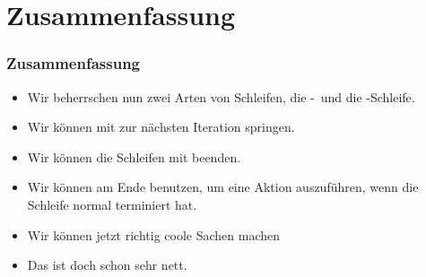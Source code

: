 \documentclass[aspectratio=169,mathserif,notheorems]{beamer}%
\begin{document}
\section{Zusammenfassung}%
%
\begin{frame}%
\frametitle{Zusammenfassung}%
\begin{itemize}%
\item Wir beherrschen nun zwei Arten von Schleifen, die -\ und die -Schleife.%
%
\item<2-> Wir können mit  zur nächsten Iteration springen.%
%
\item<3-> Wir können die Schleifen mit  beenden.%
%
\item<4-> Wir können  am Ende benutzen, um eine Aktion auszuführen, wenn die Schleife normal terminiert hat.%
%
\item<5-> Wir können jetzt richtig coole Sachen machen%
\item<9-> Das ist doch schon sehr nett.%
\end{itemize}%
\end{frame}%
%
\endPresentation%
\end{document}
